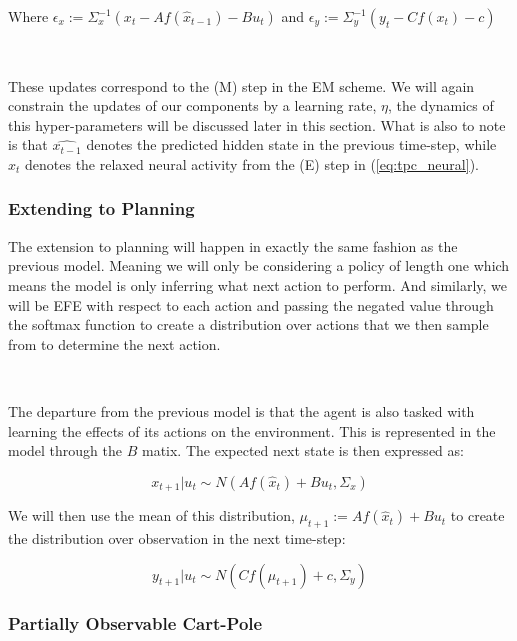 \documentclass{article}
\newcommand{\refp}[1]{(\ref{#1})}
\begin{document}
Where $\epsilon_x := \Sigma_x^{-1}(x_t - A f(\hat{x}_{t-1}) - Bu_t)$ and $\epsilon_y := \Sigma_y^{-1}(y_t - C f(x_t) - c)$

\

These updates correspond to the (M) step in the EM scheme. We will again constrain the updates of our components by a learning rate, $\eta$, the dynamics of this hyper-parameters will be discussed later in this section. What is also to note is that $\hat{x_{t-1}}$ denotes the predicted hidden state in the previous time-step, while $x_t$ denotes the relaxed neural activity from the (E) step in \refp{eq:tpc_neural}. 

\subsubsection{Extending to Planning}

The extension to planning will happen in exactly the same fashion as the previous model. Meaning we will only be considering a policy of length one which means the model is only inferring what next action to perform. And similarly, we will be EFE with respect to each action and passing the negated value through the softmax function to create a distribution over actions that we then sample from to determine the next action. 

\

The departure from the previous model is that the agent is also tasked with learning the effects of its actions on the environment. This is represented in the model through the $B$ matix. The expected next state is then expressed as:

\begin{equation}
	x_{t+1} | u_t \sim N(A f(\hat{x}_{t}) + B u_{t}, \Sigma_x)
\end{equation}

We will then use the mean of this distribution, $\mu_{t+1} := A f(\hat{x}_{t}) + B u_{t}$ to create the distribution over observation in the next time-step:

\begin{equation}
	y_{t+1} | u_t \sim N( C f(\mu_{t+1}) + c, \Sigma_y)
\end{equation}

\subsubsection{Partially Observable Cart-Pole}
\end{document}
